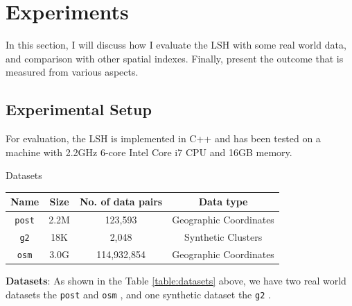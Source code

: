 \chapter{Experiments}
In this section, I will discuss how I evaluate the LSH with some real world data, and comparison with other spatial indexes. Finally, present the outcome that is measured from various aspects.

\section{Experimental Setup}

For evaluation, the LSH is implemented in C++ and has been tested on a machine with 2.2GHz 6-core Intel Core i7 CPU and 16GB memory. 

\begin{center}
\begin{adjustbox}{max width={\textwidth}, max totalheight={\textheight},keepaspectratio}
\begin{threeparttable}
\caption{Datasets}

\begin{tabular}{c|c c c}
    \toprule
    \textbf{Name}    &\textbf{Size}  & \textbf{No. of data pairs} & \textbf{Data type}             \\ \midrule 
    \texttt{post}    & 2.2M & 123,593             &Geographic Coordinates \\
    \texttt{g2}      & 18K  & 2,048               & Synthetic Clusters    \\
    \texttt{osm}     & 3.0G & 114,932,854         &Geographic Coordinates \\
     \bottomrule
\end{tabular}
\end{threeparttable}
\label{table:datasets}
\end{adjustbox}
\end{center}

\textbf{Datasets}: As shown in the Table \ref{table:datasets} above, we have two real world datasets the \texttt{post} \cite{rtreeportal} and \texttt{osm} \cite{OpenStreetMap}, and one synthetic dataset the \texttt{g2} \cite{G2sets}.

